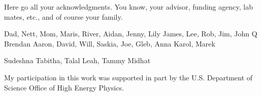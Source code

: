 
Here go all your acknowledgments. You know, your advisor, funding agency, lab
mates, etc., and of course your family.



Dad, Nett, Mom, Maris, River, Aidan, Jenny, Lily
James, Lee, Rob, Jim, John Q
Brendan
Aaron, David, Will, Saskia, Joe, Gleb, Anna
Karol, Marek


Sudeshna
Tabitha, Talal
Leah, Tammy
Midhat



My participation in this work was supported in part by the U.S. Department of Science Office of High Energy Physics.
